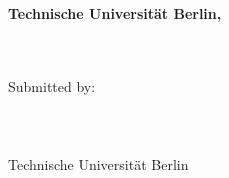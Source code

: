 {\begin{center}
\vfill

\textbf{Technische Universit\"at Berlin, \projectYear} \\
\small{\facultyName \\
    \departmentName}
\vspace{1cm}
\end{center} %
}

\thispagestyle{empty}
\clearpage

\vspace*{\fill}
\begin{centering}
    {\huge\textbf{\projectTitle}\par}
    \vspace{1cm}
    \large{\thesisType}\\
    \vspace{1cm}
    Submitted by:\\
    \authors\\
    \matrikel                     \\
    \authorEmail                  \\
    \vspace{1cm}
    Technische Universit\"at Berlin\\
    \facultyName \\
    \departmentName \\
    \vspace{1cm}
    \projectYear\\

\end{centering}

\vspace*{\fill}
\thispagestyle{empty}
\clearpage

